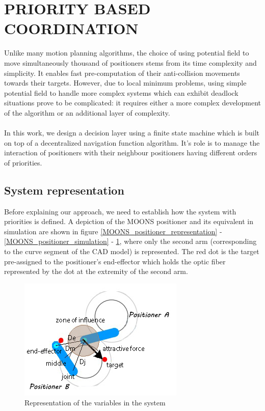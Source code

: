 \documentclass[]{spie}  %
\begin{document}
	\section{PRIORITY BASED COORDINATION}
	\label{PRIORITY BASED COORDINATION}
	
	
	Unlike many motion planning algorithms, the choice of using potential field to move simultaneously thousand of positioners stems from its time complexity and simplicity. It enables fast pre-computation of their anti-collision movements towards their targets. However, due to local minimum problems, using simple potential field to handle more complex systems which can exhibit deadlock situations prove to be complicated: it requires either a more complex development of the algorithm or an additional layer of complexity.\\\\
	In this work, we design a decision layer using a finite state machine which is built on top of a decentralized navigation function algorithm. It's role is to manage the interaction of positioners with their neighbour positioners having different orders of priorities. 

	\subsection{System representation}	
		\label{Finite-state machine} 
	
	Before explaining our approach, we need to establish how the system with priorities is defined. 
	 A depiction of the MOONS positioner and its equivalent in simulation are shown in figure \ref{MOONS_positioner_representation} - \ref{MOONS_positioner_simulation} - \ref{sys_representation}, where only the second arm (corresponding to the curve segment of the CAD model) is represented. The red dot is the target pre-assigned to the positioner's end-effector which holds the optic fiber represented by the dot at the extremity of the second arm.
		\begin{figure}[H]
			\centering
			\includegraphics[scale=0.56]{images/system_representation.jpg}
			\caption{Representation of the variables in the system}
			\label{sys_representation}
		\end{figure}
	
\end{document}
